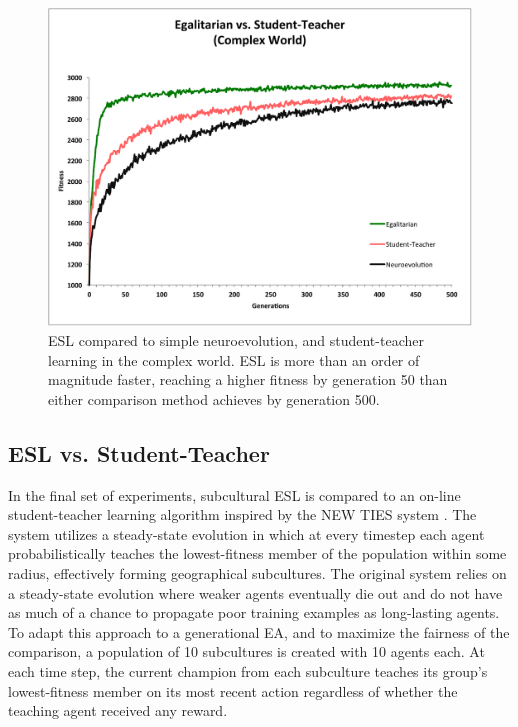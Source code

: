 \documentclass{sig-alternate}
\begin{document}
\begin{figure}[t]
  \centering
    \includegraphics[scale=.41]{egalitarian_vs_student_teacher_complex.pdf}
  \caption{ESL compared to simple neuroevolution, and student-teacher learning in the complex world.  ESL is more than an order of magnitude faster, reaching a higher fitness by generation 50 than either comparison method achieves by generation 500.}
  \label{fig:reward-studentteacher-complex}
\end{figure}

\subsection{ESL vs. Student-Teacher}
In the final set of experiments, subcultural ESL is compared to an on-line student-teacher learning algorithm inspired by the NEW TIES system \cite{haasdijk2008social}. The system utilizes a steady-state evolution in which at every timestep each agent probabilistically teaches the lowest-fitness member of the population within some radius, effectively forming geographical subcultures. The original system relies on a steady-state evolution where weaker agents eventually die out and do not have as much of a chance to propagate poor training examples as long-lasting agents. To adapt this approach to a generational EA, and to maximize the fairness of the comparison, a population of 10 subcultures is created with 10 agents each. At each time step, the current champion from each subculture teaches its group's lowest-fitness member on its most recent action regardless of whether the teaching agent received any reward.
\end{document}

